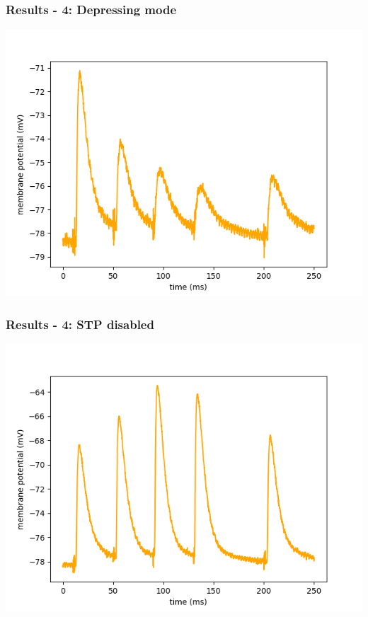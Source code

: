 \documentclass{beamer}
\begin{document}
\begin{frame}
	\frametitle{Results - 4: Depressing mode}
	\centering
	\includegraphics[width=\textwidth]{figures/stp_depressing.png}
\end{frame}
\begin{frame}
	\frametitle{Results - 4: STP disabled}
	\centering
	\includegraphics[width=\textwidth]{figures/stp_off.png}
\end{frame}

\end{document}

